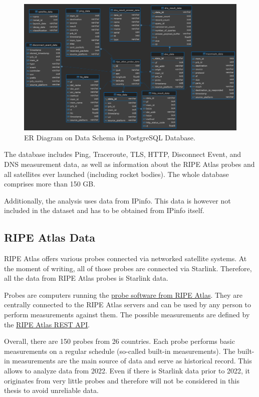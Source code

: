 \begin{figure}
	\includegraphics[width=\textwidth]{./chapters/3-methodology/img/er-diagram.png}
	\caption{ER Diagram on Data Schema in PostgreSQL Database.}
	\label{fig:er-diagram}
\end{figure}

The database includes Ping, Traceroute, TLS, HTTP, Disconnect Event, and DNS measurement data, as well as information about the RIPE Atlas probes and all satellites ever launched (including rocket bodies).
The whole database comprises more than 150 GB.

Additionally, the analysis uses data from IPinfo. This data is however not included in the dataset and has to be obtained from IPinfo itself.

\subsection*{RIPE Atlas Data}

RIPE Atlas offers various probes connected via networked satellite systems. At the moment of writing, all of those probes are connected via Starlink. Therefore, all the data from RIPE Atlas probes is Starlink data.

Probes are computers running the \href{https://github.com/RIPE-NCC/ripe-atlas-software-probe}{probe software from RIPE Atlas}. They are centrally connected to the RIPE Atlas servers and can be used by any person to perform measurements against them. The possible measurements are defined by the \href{https://atlas.ripe.net/docs/apis/rest-api-reference/}{RIPE Atlas REST API}.

Overall, there are 150 probes from 26 countries. Each probe performs basic measurements on a regular schedule (so-called built-in measurements). The built-in measurements are the main source of data and serve as historical record. This allows to analyze data from 2022. Even if there is Starlink data prior to 2022, it originates from very little probes and therefore will not be considered in this thesis to avoid unreliable data.
